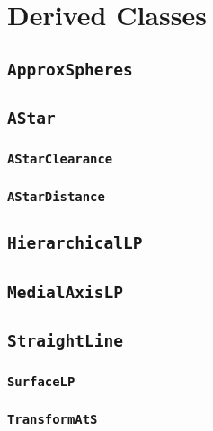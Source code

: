 \section{Derived Classes}

\subsection{\texttt{ApproxSpheres}}

\subsection{\texttt{AStar}}

\subsubsection{\texttt{AStarClearance}}

\subsubsection{\texttt{AStarDistance}}

\subsection{\texttt{HierarchicalLP}}

\subsection{\texttt{MedialAxisLP}}

\subsection{\texttt{StraightLine}}

\subsubsection{\texttt{SurfaceLP}}

\subsubsection{\texttt{TransformAtS}}

